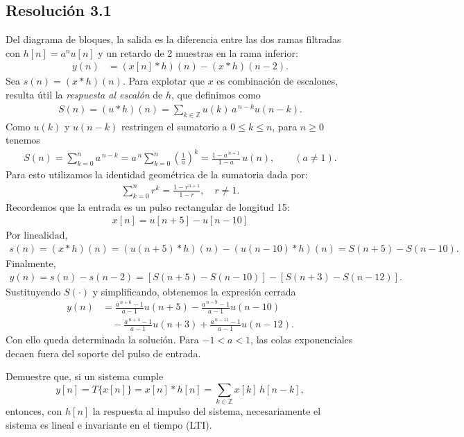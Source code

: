 \documentclass[
  11pt,
  letterpaper,
   addpoints,
  ]{exam}
\begin{document}
\begin{questions}
\begin{solution}
  \subsection*{Resolución 3.1}
Del diagrama de bloques, la salida es la diferencia entre las dos ramas filtradas con $h[n]=a^n u[n]$ y un retardo de 2 muestras en la rama inferior:
\begin{align}
  y(n) &= (x[n]*h)(n) - (x*h)(n-2).
\end{align}
Sea $s(n)=(x*h)(n)$. Para explotar que $x$ es combinación de escalones, resulta útil la \emph{respuesta al escalón} de $h$, que definimos como
\begin{align}
  S(n) = (u*h)(n) = \sum_{k\in\mathbb{Z}} u(k)\,a^{\,n-k} u(n-k).
\end{align}
Como $u(k)$ y $u(n-k)$ restringen el sumatorio a $0\le k\le n$, para $n\ge 0$ tenemos
\begin{align}
  S(n) = \sum_{k=0}^{n} a^{\,n-k} = a^{\,n}\sum_{k=0}^{n} \left(\frac{1}{a}\right)^{k}
       = \frac{1-a^{\,n+1}}{1-a}\,u(n),\qquad (a\ne 1).
\end{align}
Para esto utilizamos la identidad geométrica de la sumatoria dada por:
\begin{align}
  \sum_{k=0}^n r^k = \frac{1-r^{n+1}}{1-r}, \quad r \neq 1.
\end{align}
Recordemos que la entrada es un pulso rectangular de longitud 15:
\begin{align}
  x[n] = u[n+5] - u[n-10]
\end{align}
Por linealidad,
\begin{align}
  s(n) = (x*h)(n) = (u(n+5)*h)(n) - (u(n-10)*h)(n) = S(n+5) - S(n-10).
\end{align}
Finalmente,
\begin{align}
  y(n) = s(n) - s(n-2) = [S(n+5) - S(n-10)] - [S(n+3) - S(n-12)].
\end{align}
Sustituyendo $S(\cdot)$ y simplificando, obtenemos la expresión cerrada
\begin{align}
  y(n)
  &= \frac{a^{\,n+6}-1}{a-1} u(n+5)
   - \frac{a^{\,n-9}-1}{a-1} u(n-10) \\
  &\quad - \frac{a^{\,n+4}-1}{a-1} u(n+3)
   + \frac{a^{\,n-11}-1}{a-1} u(n-12).
\end{align}
Con ello queda determinada la solución. Para $-1<a<1$, las colas exponenciales decaen fuera del soporte del pulso de entrada.
\end{solution}

\question Demuestre que, si un sistema cumple
\[ y[n]=T\{x[n]\}=x[n]*h[n]=\sum_{k\in\mathbb{Z}} x[k] \, h[n-k], \]
entonces, con \(h[n]\) la respuesta al impulso del sistema, necesariamente el sistema es lineal e invariante en el tiempo (LTI).



\end{questions}
\end{document}
